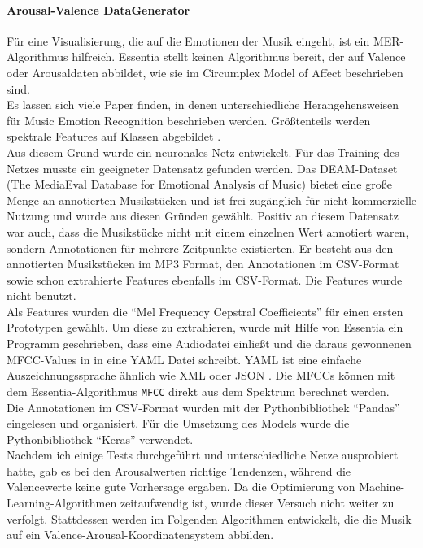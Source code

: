 \documentclass[11pt,a4paper]{article}
\begin{document}
\paragraph{Arousal-Valence DataGenerator}
\label{sec:AVDataGenerator}
Für eine Visualisierung, die auf die Emotionen der Musik eingeht, ist ein MER-Algorithmus hilfreich. Essentia stellt keinen Algorithmus bereit, der auf Valence oder Arousaldaten abbildet, wie sie im Circumplex Model of Affect beschrieben sind.\\
Es lassen sich viele Paper finden, in denen unterschiedliche Herangehensweisen für Music Emotion Recognition beschrieben werden. Größtenteils werden spektrale Features auf Klassen abgebildet \cite[S. 159]{lerch2012introduction}.\\
Aus diesem Grund wurde ein neuronales Netz entwickelt. Für das Training des Netzes musste ein geeigneter Datensatz gefunden werden. Das DEAM-Dataset (The MediaEval Database for Emotional Analysis of Music) bietet eine große Menge an annotierten Musikstücken und ist frei zugänglich für nicht kommerzielle Nutzung \cite{AlajankiEmoInMusicAnalysis} und wurde aus diesen Gründen gewählt. Positiv an diesem Datensatz war auch, dass die Musikstücke nicht mit einem einzelnen Wert annotiert waren, sondern Annotationen für mehrere Zeitpunkte existierten. Er besteht aus den annotierten Musikstücken im MP3 Format, den Annotationen im CSV-Format sowie schon extrahierte Features ebenfalls im CSV-Format. Die Features wurde nicht benutzt.\\
Als Features wurden die ``Mel Frequency Cepstral Coefficients'' für einen ersten Prototypen gewählt. Um diese zu extrahieren, wurde mit Hilfe von Essentia ein Programm geschrieben, dass eine Audiodatei einließt und die daraus gewonnenen MFCC-Values in in eine YAML Datei schreibt. YAML ist eine einfache Auszeichnungssprache ähnlich wie XML oder JSON \cite{yamlDoc}. Die MFCCs können mit dem Essentia-Algorithmus \lstinline!MFCC! direkt aus dem Spektrum berechnet werden.\\
Die Annotationen im CSV-Format wurden mit der Pythonbibliothek ``Pandas''\cite{pandasDoc} eingelesen und organisiert. Für die Umsetzung des Models wurde die Pythonbibliothek ``Keras''\cite{kerasDoc} verwendet.\\
Nachdem ich einige Tests durchgeführt und unterschiedliche Netze ausprobiert hatte, gab es bei den Arousalwerten richtige Tendenzen, während die Valencewerte keine gute Vorhersage ergaben. Da die Optimierung von Machine-Learning-Algorithmen zeitaufwendig ist, wurde dieser Versuch nicht weiter zu verfolgt. Stattdessen werden im Folgenden Algorithmen entwickelt, die die Musik auf ein Valence-Arousal-Koordinatensystem abbilden.
\end{document}
